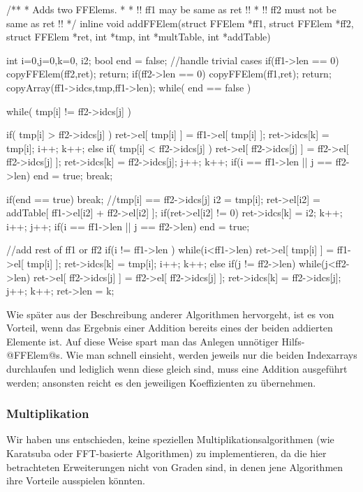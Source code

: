 \begin{ccode}[caption={Aus \url{../Sage/enumeratePCNs.c}}]
/**
 * Adds two FFElems.
 *
 * !! ff1 may be same as ret !!
 * !! ff2 must not be same as ret !!
 */
inline void addFFElem(struct FFElem *ff1, struct FFElem *ff2,
        struct FFElem *ret,
        int *tmp,
        int *multTable, int *addTable){
    int i=0,j=0,k=0, i2;
    bool end = false;
    //handle trivial cases
    if(ff1->len == 0){
        copyFFElem(ff2,ret);
        return;
    }
    if(ff2->len == 0){
        copyFFElem(ff1,ret);
        return;
    }
    copyArray(ff1->idcs,tmp,ff1->len);
    while( end == false ){
        while( tmp[i] != ff2->idcs[j] ){
            if( tmp[i] > ff2->idcs[j] ){
                ret->el[ tmp[i] ] = ff1->el[ tmp[i] ];
                ret->idcs[k] = tmp[i];
                i++; k++;
            }else if( tmp[i] < ff2->idcs[j] ){
                ret->el[ ff2->idcs[j] ] = ff2->el[ ff2->idcs[j] ];
                ret->idcs[k] = ff2->idcs[j];
                j++; k++;
            }
            if(i == ff1->len || j == ff2->len){
                end = true;
                break;
            }

        }
        if(end == true) break;
        //tmp[i] == ff2->idcs[j]
        i2 = tmp[i];
        ret->el[i2] = addTable[ ff1->el[i2] + ff2->el[i2] ];
        if(ret->el[i2] != 0){
            ret->idcs[k] = i2;
            k++;
        }
        i++; j++;
        if(i == ff1->len || j == ff2->len) end = true;
    }
    //add rest of ff1 or ff2
    if(i != ff1->len ){
        while(i<ff1->len){
            ret->el[ tmp[i] ] = ff1->el[ tmp[i] ];
            ret->idcs[k] = tmp[i];
            i++; k++;
        }
    }else if(j != ff2->len){
        while(j<ff2->len){
            ret->el[ ff2->idcs[j] ] = ff2->el[ ff2->idcs[j] ];
            ret->idcs[k] = ff2->idcs[j];
            j++; k++;
        }
    }
    ret->len = k;
}
\end{ccode}  

Wie später aus der Beschreibung anderer Algorithmen hervorgeht, ist es von
Vorteil, wenn das Ergebnis einer Addition bereits eines der beiden addierten
Elemente ist. Auf diese Weise spart man das Anlegen unnötiger Hilfs-@FFElem@s.
Wie man schnell einsieht, werden jeweils nur die beiden Indexarrays durchlaufen
und lediglich wenn diese gleich sind, muss eine Addition ausgeführt werden;
ansonsten reicht es den jeweiligen Koeffizienten zu übernehmen.


\subsubsection{Multiplikation}
Wir haben uns entschieden, keine speziellen Multiplikationsalgorithmen 
(wie Karatsuba oder FFT-basierte Algorithmen) zu implementieren, da
die hier betrachteten Erweiterungen nicht von Graden sind, in denen jene
Algorithmen ihre Vorteile ausspielen könnten.

